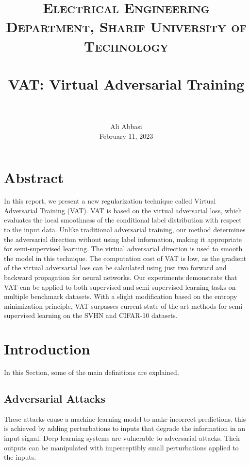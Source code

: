 \documentclass[paper=a4, fontsize=11pt]{scrartcl}
\title{
		\usefont{OT1}{bch}{b}{n}
		\normalfont \normalsize \textsc{Electrical Engineering Department, Sharif University of Technology} \\ [25pt]
		\horrule{0.5pt} \\[0.4cm]
		\huge VAT: Virtual Adversarial Training \\
		\horrule{2pt} \\[0.5cm]
}
\author{
		\normalfont 								\normalsize
        Ali Abbasi\\[-3pt]		\normalsize
        February 11, 2023
}
\date{}
\numberwithin{equation}{section}		%
\numberwithin{figure}{section}			%
\numberwithin{table}{section}				%
\begin{document}
\maketitle
\section{Abstract}
In this report, we present a new regularization technique called Virtual Adversarial Training (VAT). VAT is based on the virtual adversarial loss, which evaluates the local smoothness of the conditional label distribution with respect to the input data. Unlike traditional adversarial training, our method determines the adversarial direction without using label information, making it appropriate for semi-supervised learning. The virtual adversarial direction is used to smooth the model in this technique. The computation cost of VAT is low, as the gradient of the virtual adversarial loss can be calculated using just two forward and backward propagation for neural networks. Our experiments demonstrate that VAT can be    applied to both supervised and semi-supervised learning tasks on multiple benchmark datasets. With a slight modification based on the entropy minimization principle, VAT surpasses current state-of-the-art methods for semi-supervised learning on the SVHN and CIFAR-10 datasets.


\section{Introduction}
In this Section, some of the main definitions are explained.
\subsection{Adversarial Attacks}
These attacks cause a machine-learning model to make incorrect predictions. this is achieved by adding perturbations to inputs that degrade the information in an input signal. Deep learning systems are vulnerable to adversarial attacks. Their outputs can be manipulated with imperceptibly small perturbations applied to the inputs.
\end{document}
